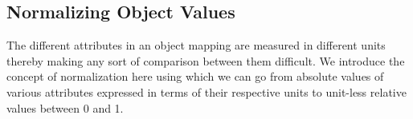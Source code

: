 \documentclass{jfp}
\newcommand{\prog}[1]{\texttt{#1}}
\begin{document}


 
                               



\subsection{Normalizing Object Values}
The different attributes in an object mapping are measured in different units thereby making any sort of comparison between them difficult. We introduce the concept of normalization here using which we can go from absolute values of various attributes expressed in terms of their respective units to unit-less relative values between 0 and 1. 
\end{document}
